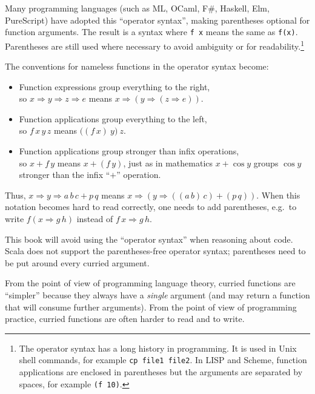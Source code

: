 Many programming languages (such as ML, OCaml, F\#, Haskell, Elm,
PureScript) have adopted this ``operator syntax'',
making parentheses optional for function arguments. The result is
a syntax where \lstinline!f x!
means the same as \lstinline!f(x)!.
Parentheses are still used where necessary to avoid ambiguity or for
readability.\footnote{The operator syntax has a long history in programming. It is used
in Unix shell commands, for example \lstinline!cp file1 file2!.
In LISP and Scheme, function applications are enclosed in parentheses
but the arguments are separated by spaces, for example \lstinline!(f 10)!.}

The conventions for nameless functions in the operator syntax become:
\begin{itemize}
\item Function expressions group everything to the right,\\
so $x\Rightarrow y\Rightarrow z\Rightarrow e$ means $x\Rightarrow\left(y\Rightarrow\left(z\Rightarrow e\right)\right)$.
\item Function applications group everything to the left,\\
so $f\,x\,y\,z$ means $\big((f\,x)\:y\big)\:z$.
\item Function applications group stronger than infix operations,\\
so $x+f\,y$ means $x+(f\,y)$, just as in mathematics $x+\cos y$
groups $\cos y$ stronger than the infix ``$+$'' operation.
\end{itemize}
Thus, $x\Rightarrow y\Rightarrow a\,b\,c+p\,q$ means $x\Rightarrow\left(y\Rightarrow\left(\left(a\,b\right)\,c\right)+(p\,q)\right)$.
When this notation becomes hard to read correctly, one needs to add
parentheses, e.g.\ to write $f(x\Rightarrow g\,h)$ instead of $f\,x\Rightarrow g\,h$.

This book will avoid using the ``operator syntax'' when reasoning
about code. Scala does not support the parentheses-free operator syntax;
parentheses need to be put around every curried argument.

From the point of view of programming language theory, curried functions
are ``simpler'' because they always have a \emph{single} argument
(and may return a function that will consume further arguments). From
the point of view of programming practice, curried functions are often
harder to read and to write.

